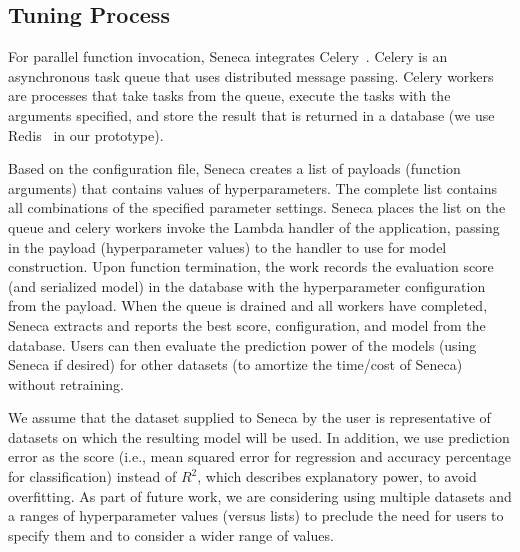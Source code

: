 \subsection{Tuning Process}

For parallel function invocation, Seneca integrates 
Celery~\cite{ref:celery}. Celery is an asynchronous task queue 
that uses distributed message passing. Celery workers are processes 
that take tasks from the queue, execute the tasks with the arguments specified, 
and store the result that is returned 
in a database (we use Redis~\cite{ref:redis} in our prototype). 

Based on the configuration file, Seneca creates a list of 
payloads (function arguments) that contains values of 
hyperparameters.  The complete list contains all combinations of the
specified parameter
settings.  Seneca places the list on the queue and celery 
workers invoke the Lambda handler of the application, passing in the
payload (hyperparameter values) to the handler to use for model construction.  
Upon function
termination, the work records the evaluation score (and serialized model)
in the database with the hyperparameter configuration from the payload.
When the queue is drained and all workers have completed, Seneca
extracts and reports the best score, configuration, and model from the database.
Users can then evaluate the prediction power of the models (using Seneca if desired) 
for other datasets (to amortize the time/cost of Seneca) without retraining. 

We assume that the dataset supplied to Seneca by the user
is representative of datasets on which the 
resulting model will be used.  In addition, we use prediction error as the 
score (i.e., mean squared error for regression and accuracy percentage for classification) 
instead of $R^2$, which describes explanatory power, to avoid overfitting.
As part of future work, we are considering using multiple datasets and a ranges
of hyperparameter values (versus lists) to preclude the need for users to specify
them and to consider a wider range of values.
